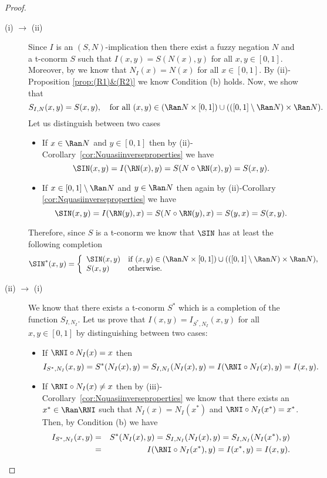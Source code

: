 \begin{proof} \hspace{0.5cm}
	\begin{description}
		\item[(i) $\to$ (ii)] Since $I$ is an $(S,N)$-implication then there exist a fuzzy negation $N$ and a t-conorm $S$ such that $I(x,y)=S(N(x),y)$ for all $x,y \in [0,1]$. Moreover, by \cite[Proposition 2.4.3]{Baczynski2008} we know that $N_I(x)=N(x)$ for all $x \in [0,1]$. By (ii)-Proposition \ref{prop:(R1)&(R2)} we know Condition (b) holds. Now, we show that
		$$S_{I,N}(x,y)=S(x,y), \quad \text{for all } (x,y) \in (\Ran N \times [0,1]) \cup (([0,1] \setminus \Ran N) \times \Ran N).$$
		Let us distinguish between two cases
		\begin{itemize}
			\item If $x \in \Ran N$ and $y \in [0,1]$ then by {(ii)-Corollary~\ref{cor:Nquasiinverseproperties}} we have
			$$\SIN(x,y)=I(\RN (x),y) = S( N \circ \RN(x),y)=S(x,y).$$
			\item If   $x \in [0,1] \setminus \Ran N$ and $y \in \Ran N$ then again by (ii)-Corollary \ref{cor:Nquasiinverseproperties} we have
			$$\SIN(x,y)=I(\RN(y),x)=S(N \circ \RN(y),x)=S(y,x)=S(x,y).$$
		\end{itemize}
		Therefore, since $S$ is a t-conorm we know that $\SIN$ has at least the following completion
		$$
		\SIN^*(x,y)
		=
		\left\{ \begin{array}{ll}
			\SIN(x,y) &   \text{if }   (x,y) \in (\Ran N \times [0,1]) \cup (([0,1] \setminus \Ran N) \times \Ran N), \\
			S(x,y) & \text{otherwise.}
		\end{array} \right.
		$$
		\item[(ii) $\to$ (i)] We know that there exists a t-conorm $S^*$ which is a completion of the function $S_{I,N_I}$. Let us prove that $I(x,y)=I_{S^*,N_I}(x,y)$ for all $x,y \in [0,1]$ by distinguishing between two cases:
		\begin{itemize}
			\item If $\RNI \circ N_I(x)=x$ then
			$$I_{S^*,N_I}(x,y)=S^*(N_I(x),y)=S_{I,N_I}(N_I(x),y)=I(\RNI \circ N_I(x),y)=I(x,y).$$
			\item If $\RNI \circ N_I(x) \not = x$ then by {(iii)-Corollary~\ref{cor:Nquasiinverseproperties}} we know that there exists an $x^* \in \Ran \RNI$ such that $N_I(x)=N_I(x^*)$ and $\RNI \circ N_I(x^*)=x^*$. Then, by Condition (b) we have
			\begin{eqnarray*}
				I_{S^*,N_I}(x,y)&=&S^*(N_I(x),y)=S_{I,N_I}(N_I(x),y) = S_{I,N_I} (N_I(x^*),y)\\
				&=& I(\RNI \circ N_I(x^*),y)=I(x^*,y)=I(x,y).
			\end{eqnarray*}
		\end{itemize}
	\end{description}
\end{proof}

